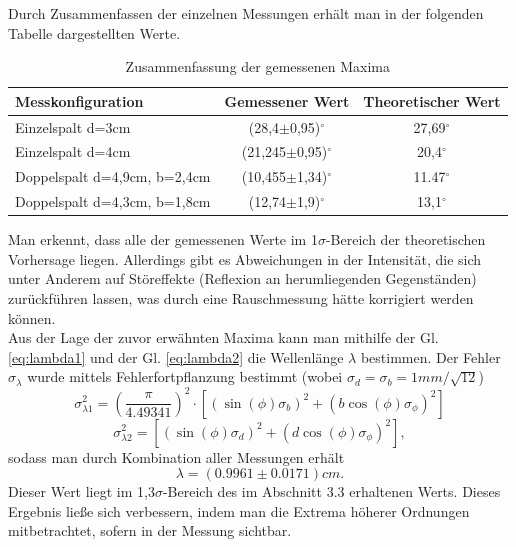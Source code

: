 \documentclass[12pt,a4paper]{article}
\begin{document}
Durch Zusammenfassen der einzelnen Messungen erhält man in der folgenden Tabelle dargestellten Werte.\\
\begin{table}[H]
	\centering
	\begin{tabular}{|l|c|c|}
		\hline 
		Messkonfiguration& Gemessener Wert & Theoretischer Wert \\ 
		\hline 
		Einzelspalt d=3cm &(28,4$\pm$0,95)$^\circ$&27,69$^\circ$ \\ 
		\hline 
		Einzelspalt d=4cm &(21,245$\pm$0,95)$^\circ$ &20,4$^\circ$ \\ 
		\hline 
		Doppelspalt d=4,9cm, b=2,4cm&(10,455$\pm$1,34)$^\circ$ &11.47$^\circ$ \\ 
		\hline 
		Doppelspalt d=4,3cm, b=1,8cm&(12,74$\pm$1,9)$^\circ$ &13,1$^\circ$ \\
		\hline 
	\end{tabular}
	\caption{Zusammenfassung der gemessenen Maxima}
\end{table}
Man erkennt, dass alle der gemessenen Werte im 1$\sigma$-Bereich der theoretischen Vorhersage liegen. Allerdings gibt es Abweichungen in der Intensität, die sich unter Anderem auf Störeffekte (Reflexion an herumliegenden Gegenständen) zurückführen lassen, was durch eine Rauschmessung hätte korrigiert werden können.\\
Aus der Lage der zuvor erwähnten Maxima kann man mithilfe der Gl. \ref{eq:lambda1} und der Gl. \ref{eq:lambda2} die Wellenlänge $\lambda$ bestimmen. Der Fehler $\sigma_\lambda$ wurde mittels Fehlerfortpflanzung bestimmt (wobei $\sigma_d=\sigma_b=1mm/\sqrt{12}$)
\begin{equation*}
	\sigma_{\lambda 1}^2 = \left(\frac{\pi}{4.49341}\right)^2 \cdot \left[(\sin(\phi)\sigma_b)^2+(b\cos(\phi)\sigma_\phi)^2\right]
\end{equation*}
\begin{equation*}
	\sigma_{\lambda {2}}^2 = \left[(\sin(\phi)\sigma_d)^2+(d\cos(\phi)\sigma_\phi)^2\right],
\end{equation*}
sodass man durch Kombination aller Messungen erhält
\begin{equation}
	\lambda = (0.9961 \pm 0.0171) cm.
\end{equation}
Dieser Wert liegt im 1,3$\sigma$-Bereich des im Abschnitt 3.3 erhaltenen Werts. Dieses Ergebnis lie\ss e sich verbessern, indem man die Extrema höherer Ordnungen mitbetrachtet, sofern in der Messung sichtbar.
\end{document}
